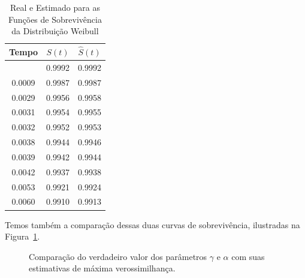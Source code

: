 \documentclass[
  12pt,
  letterpaper,
  DIV=11,
  numbers=noendperiod]{scrreprt}
\begin{document}
\begin{longtable}[]{@{}ccc@{}}

\caption{\label{tbl-EMVweibullSt}Real e Estimado para as Funções de
Sobrevivência da Distribuição Weibull}

\tabularnewline

\toprule\noalign{}
Tempo & \(S(t)\) & \(\hat{S}(t)\) \\
\midrule\noalign{}
\endhead
\bottomrule\noalign{}
\endlastfoot
0.0006 & 0.9992 & 0.9992 \\
0.0009 & 0.9987 & 0.9987 \\
0.0029 & 0.9956 & 0.9958 \\
0.0031 & 0.9954 & 0.9955 \\
0.0032 & 0.9952 & 0.9953 \\
0.0038 & 0.9944 & 0.9946 \\
0.0039 & 0.9942 & 0.9944 \\
0.0042 & 0.9937 & 0.9938 \\
0.0053 & 0.9921 & 0.9924 \\
0.0060 & 0.9910 & 0.9913 \\

\end{longtable}

Temos também a comparação dessas duas curvas de sobrevivência,
ilustradas na Figura~\ref{fig-CompEMVWeibull}.

\begin{figure}[H]

\caption{\label{fig-CompEMVWeibull}Comparação do verdadeiro valor dos
parâmetros \(\gamma\) e \(\alpha\) com suas estimativas de máxima
verossimilhança.}


\end{figure}%
\end{document}
